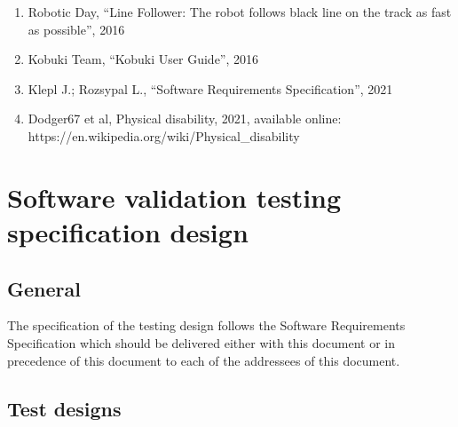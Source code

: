 \begin{enumerate}
    \item \label{rules} Robotic Day, ``Line Follower: The robot follows black line on the track as fast as possible'', 2016
    \item \label{guide} Kobuki Team, ``Kobuki User Guide'', 2016
    \item \label{guide} Klepl J.; Rozsypal L., ``Software Requirements Specification'', 2021
    \item \label{disability} Dodger67 et al, Physical disability, 2021, available online:\\ https://en.wikipedia.org/wiki/Physical\_disability
\end{enumerate}

\chapter{Software validation testing specification design}
\label{Requirements}

\section{General}

The specification of the testing design follows the Software Requirements Specification which should be delivered either with this document or in precedence of this document to each of the addressees of this document.

\section{Test designs}


\def\srs#1#2#3#4#5{\item\textbf{Test design \textit{#1}}

\textbf{General}:

This test design establishes procedures for the validation on the #3 as specified in the Software Requirements Specification (as \textbf{SRS\_#2}).

\textbf{Features to be tested}:

This test design will test the following features: #4

\textbf{Approach refinements}:

#5

}

